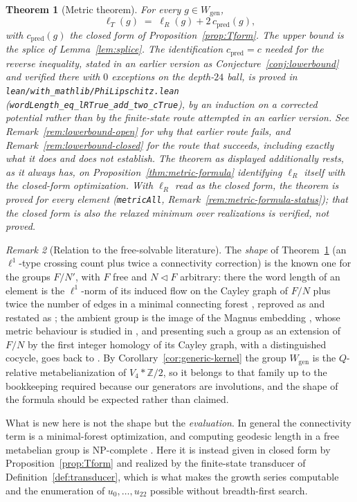 \documentclass[11pt]{article}
\theoremstyle{plain}
\newtheorem{theorem}{Theorem}
\theoremstyle{definition}
\theoremstyle{remark}
\newtheorem{remark}[theorem]{Remark}
\newcommand{\Z}{\mathbb{Z}}
\begin{document}
\begin{theorem}[Metric theorem]
\label{thm:metric}
For every $g\in W_{\mathrm{gen}}$,
\[
\ell_T(g)\;=\;\ell_R(g)+2\,c_{\mathrm{pred}}(g),
\]
with $c_{\mathrm{pred}}(g)$ the closed form of
Proposition~\textup{\ref{prop:Tform}}. The upper bound is the splice of
Lemma~\textup{\ref{lem:splice}}. The identification $c_{\mathrm{pred}}=c$
needed for the reverse inequality, stated in an earlier version as
Conjecture~\textup{\ref{conj:lowerbound}} and verified there with $0$
exceptions on the depth-$24$ ball, is proved
in \texttt{lean/with\_mathlib/PhiLipschitz.lean}
(\texttt{wordLength\_eq\_lRTrue\_add\_two\_cTrue}), by an induction on a
corrected potential rather than by the finite-state route attempted in an
earlier version. See Remark~\textup{\ref{rem:lowerbound-open}} for why that
earlier route fails, and Remark~\ref{rem:lowerbound-closed} for the route
that succeeds, including exactly what it does and does not establish. The
theorem as displayed additionally rests, as it always has, on
Proposition~\ref{thm:metric-formula} identifying $\ell_R$ itself with the
closed-form optimization. With $\ell_R$ read as the closed form, the
theorem is proved for every element (\texttt{metricAll},
Remark~\ref{rem:metric-formula-status}); that the closed form is also the
relaxed minimum over realizations is verified, not proved.
\end{theorem}

\begin{remark}[Relation to the free-solvable literature]
\label{rem:priorart}
The \emph{shape} of Theorem~\ref{thm:metric} (an $\ell^1$-type crossing count
plus twice a connectivity correction) is the known one for the groups
$F/N'$, with $F$ free and $N\vartriangleleft F$ arbitrary: there the word length
of an element is the $\ell^1$-norm of its induced flow on the Cayley graph of
$F/N$ plus twice the number of edges in a minimal connecting forest
\cite[Thm.~2]{DLS}, reproved as \cite[Thm.~2.10]{MRUV} and restated as
\cite[Lem.~3.2]{Sale}; the ambient group is the image of the Magnus embedding
\cite{Magnus}, whose metric behaviour is studied in \cite{Sale,Vassileva}, and
presenting such a group as an extension of $F/N$ by the first integer homology
of its Cayley graph, with a distinguished cocycle, goes back to \cite{VD}. By
Corollary~\ref{cor:generic-kernel} the group $W_{\mathrm{gen}}$ is the
$Q$-relative metabelianization of $V_4*\Z/2$, so it belongs to that family up to
the bookkeeping required because our generators are involutions, and the shape
of the formula should be expected rather than claimed.

What is new here is not the shape but the \emph{evaluation}. In general the
connectivity term is a minimal-forest optimization, and computing geodesic
length in a free metabelian group is NP-complete \cite[Thm.~4.1]{MRUV}. Here it
is instead given in closed form by Proposition~\ref{prop:Tform} and realized by
the finite-state transducer of Definition~\ref{def:transducer}, which is what
makes the growth series computable and the enumeration of $u_0,\dots,u_{22}$
possible without breadth-first search.
\end{remark}
\end{document}
